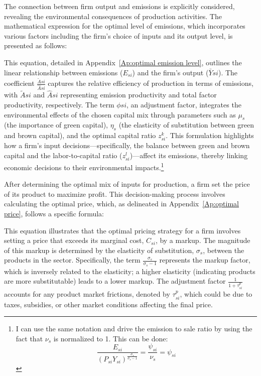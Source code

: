 The connection between firm output and emissions is explicitly considered, revealing the environmental consequences of production activities. The mathematical expression for the optimal level of emissions, which incorporates various factors including the firm's choice of inputs and its output level, is presented as follows:

This equation, detailed in Appendix~\ref{Ap:optimal emission level}, outlines the linear relationship between emissions ($E_{si}$) and the firm's output ($\bar{Y}{si}$). The coefficient $\frac{\tilde{A}{si}}{\hat{A}{si}}$ captures the relative efficiency of production in terms of emissions, with $\tilde{A}{si}$ and $\hat{A}{si}$ representing emission productivity and total factor productivity, respectively. The term $\phi{si}$, an adjustment factor, integrates the environmental effects of the chosen capital mix through parameters such as $\mu_s$ (the importance of green capital), $\eta_s$ (the elasticity of substitution between green and brown capital), and the optimal capital ratio $z^k_{si}$. This formulation highlights how a firm's input decisions—specifically, the balance between green and brown capital and the labor-to-capital ratio ($z^l_{si}$)—affect its emissions, thereby linking economic decisions to their environmental impacts.\footnote{
  I can use the same notation and drive the emission to sale ratio by using the fact that $\nu_s$ is normalized to 1. This can be done:
  \begin{equation*}
    \frac{E_{si}}{(P_{si}Y_{si})^{\frac{\sigma_s}{\sigma_s-1}}} = \frac{\psi_{si}}{\nu_s} = \psi_{si} 
  \end{equation*}
}



After determining the optimal mix of inputs for production, a firm set the price of its product to maximize profit. This decision-making process involves calculating the optimal price, which, as delineated in Appendix~\ref{Ap:optimal price}, follows a specific formula:


This equation illustrates that the optimal pricing strategy for a firm involves setting a price that exceeds its marginal cost, $C_{si}$, by a markup. The magnitude of this markup is determined by the elasticity of substitution, $\sigma_s$, between the products in the sector. Specifically, the term $\frac{\sigma_s}{\sigma_s - 1}$ represents the markup factor, which is inversely related to the elasticity; a higher elasticity (indicating products are more substitutable) leads to a lower markup. The adjustment factor $\frac{1}{1+\tau_{si}^p}$ accounts for any product market frictions, denoted by $\tau_{si}^p$, which could be due to taxes, subsidies, or other market conditions affecting the final price.

